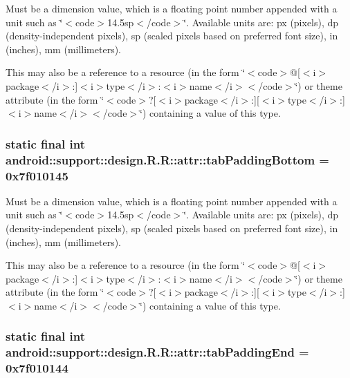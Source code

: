 Must be a dimension value, which is a floating point number appended with a unit such as \char`\"{}$<$code$>$14.5sp$<$/code$>$\char`\"{}. Available units are: px (pixels), dp (density-independent pixels), sp (scaled pixels based on preferred font size), in (inches), mm (millimeters). 

This may also be a reference to a resource (in the form \char`\"{}$<$code$>$@\mbox{[}$<$i$>$package$<$/i$>$:\mbox{]}$<$i$>$type$<$/i$>$:$<$i$>$name$<$/i$>$$<$/code$>$\char`\"{}) or theme attribute (in the form \char`\"{}$<$code$>$?\mbox{[}$<$i$>$package$<$/i$>$:\mbox{]}\mbox{[}$<$i$>$type$<$/i$>$:\mbox{]}$<$i$>$name$<$/i$>$$<$/code$>$\char`\"{}) containing a value of this type. \hypertarget{classandroid_1_1support_1_1design_1_1_r_1_1attr_333418317dfa2a2295036c3768e7269c}{
\subsubsection[{tabPaddingBottom}]{\setlength{\rightskip}{0pt plus 5cm}static final int android::support::design.R.R::attr::tabPaddingBottom = 0x7f010145}}
\label{classandroid_1_1support_1_1design_1_1_r_1_1attr_333418317dfa2a2295036c3768e7269c}


Must be a dimension value, which is a floating point number appended with a unit such as \char`\"{}$<$code$>$14.5sp$<$/code$>$\char`\"{}. Available units are: px (pixels), dp (density-independent pixels), sp (scaled pixels based on preferred font size), in (inches), mm (millimeters). 

This may also be a reference to a resource (in the form \char`\"{}$<$code$>$@\mbox{[}$<$i$>$package$<$/i$>$:\mbox{]}$<$i$>$type$<$/i$>$:$<$i$>$name$<$/i$>$$<$/code$>$\char`\"{}) or theme attribute (in the form \char`\"{}$<$code$>$?\mbox{[}$<$i$>$package$<$/i$>$:\mbox{]}\mbox{[}$<$i$>$type$<$/i$>$:\mbox{]}$<$i$>$name$<$/i$>$$<$/code$>$\char`\"{}) containing a value of this type. \hypertarget{classandroid_1_1support_1_1design_1_1_r_1_1attr_4415b80f2aa6387aeb2ae6f7a6c97ab5}{
\subsubsection[{tabPaddingEnd}]{\setlength{\rightskip}{0pt plus 5cm}static final int android::support::design.R.R::attr::tabPaddingEnd = 0x7f010144}}
\label{classandroid_1_1support_1_1design_1_1_r_1_1attr_4415b80f2aa6387aeb2ae6f7a6c97ab5}


